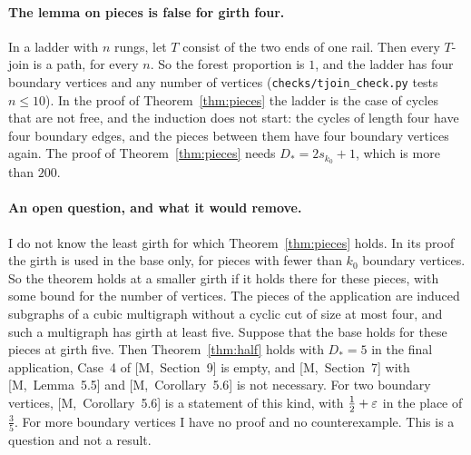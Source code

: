 \documentclass[11pt]{article}
\newcommand{\M}[1]{[M,~#1]}
\begin{document}
\paragraph{The lemma on pieces is false for girth four.} In a ladder with $n$ rungs, let $T$
consist of the two ends of one rail. Then every $T$-join is a path, for every $n$. So the forest
proportion is $1$, and the ladder has four boundary vertices and any number of vertices
(\texttt{checks/tjoin\_check.py} tests $n\le10$). In the proof of Theorem~\ref{thm:pieces} the
ladder is the case of cycles that are not free, and the induction does not start: the cycles of
length four have four boundary edges, and the pieces between them have four boundary vertices
again. The proof of Theorem~\ref{thm:pieces} needs $D_*=2s_{k_0}+1$, which is more than $200$.

\paragraph{An open question, and what it would remove.} I do not know the least girth for which
Theorem~\ref{thm:pieces} holds. In its proof the girth is used in the base only, for pieces with
fewer than $k_0$ boundary vertices. So the theorem holds at a smaller girth if it holds there for
these pieces, with some bound for the number of vertices. The pieces of the application are
induced subgraphs of a cubic multigraph without a cyclic cut of size at most four, and such a
multigraph has girth at least five. Suppose that the base holds for these pieces at girth five.
Then Theorem~\ref{thm:half} holds with $D_*=5$ in the final application, Case~4 of \M{Section~9}
is empty, and \M{Section~7} with \M{Lemma~5.5} and \M{Corollary~5.6} is not necessary. For two
boundary vertices, \M{Corollary~5.6} is a statement of this kind, with $\tfrac12+\varepsilon$ in the
place of $\frac35$. For more boundary vertices I have no proof and no counterexample. This is a
question and not a result.
\end{document}
